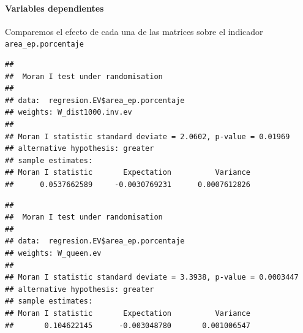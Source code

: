\documentclass[12pt,]{book}
\newenvironment{Shaded}{\begin{snugshade}}{\end{snugshade}}
\newcommand{\KeywordTok}[1]{\textcolor[rgb]{0.13,0.29,0.53}{\textbf{#1}}}
\newcommand{\DataTypeTok}[1]{\textcolor[rgb]{0.13,0.29,0.53}{#1}}
\newcommand{\OtherTok}[1]{\textcolor[rgb]{0.56,0.35,0.01}{#1}}
\newcommand{\OperatorTok}[1]{\textcolor[rgb]{0.81,0.36,0.00}{\textbf{#1}}}
\newcommand{\NormalTok}[1]{#1}
\let\oldparagraph\paragraph
\renewcommand{\paragraph}[1]{\oldparagraph{#1}\mbox{}}
\begin{document}
\paragraph{Variables dependientes}\label{variables-dependientes}

Comparemos el efecto de cada una de las matrices sobre el indicador
\texttt{area\_ep.porcentaje}

\begin{Shaded}
\end{Shaded}

\begin{verbatim}
## 
##  Moran I test under randomisation
## 
## data:  regresion.EV$area_ep.porcentaje  
## weights: W_dist1000.inv.ev  
## 
## Moran I statistic standard deviate = 2.0602, p-value = 0.01969
## alternative hypothesis: greater
## sample estimates:
## Moran I statistic       Expectation          Variance 
##      0.0537662589     -0.0030769231      0.0007612826
\end{verbatim}

\begin{Shaded}
\end{Shaded}

\begin{verbatim}
## 
##  Moran I test under randomisation
## 
## data:  regresion.EV$area_ep.porcentaje  
## weights: W_queen.ev  
## 
## Moran I statistic standard deviate = 3.3938, p-value = 0.0003447
## alternative hypothesis: greater
## sample estimates:
## Moran I statistic       Expectation          Variance 
##       0.104622145      -0.003048780       0.001006547
\end{verbatim}

\begin{Shaded}
\end{Shaded}
\end{document}
